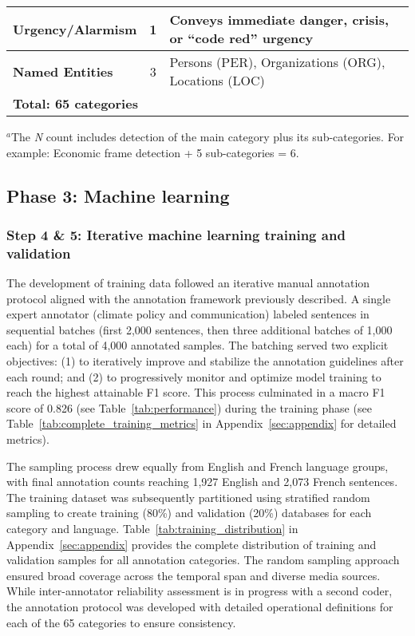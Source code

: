 \documentclass[12pt]{article}
\begin{document}
\begin{table}[!ht]
\begin{tabularx}{\textwidth}{lcX}
\midrule
\cellcolor{gray!10}\textbf{Urgency/Alarmism} & \cellcolor{gray!10}1 & \cellcolor{gray!10}Conveys immediate danger, crisis, or ``code red'' urgency \\
\midrule
\cellcolor{gray!10}\textbf{Named Entities} & \cellcolor{gray!10}3 & \cellcolor{gray!10}Persons (PER), Organizations (ORG), Locations (LOC) \\
\midrule
\multicolumn{3}{l}{\cellcolor{gray!25}\textbf{Total: 65 categories}} \\
\bottomrule
\end{tabularx}
\vspace{-0.1em}
{\footnotesize $^a$The \emph{N} count includes detection of the main category plus its sub-categories. For example: Economic frame detection + 5 sub-categories = 6.}
\end{table}

\subsection{Phase 3: Machine learning}
\subsubsection{Step 4 \& 5: Iterative machine learning training and validation}

The development of training data followed an iterative manual annotation protocol aligned with the annotation framework previously described. A single expert annotator (climate policy and communication) labeled sentences in sequential batches (first 2,000 sentences, then three additional batches of 1,000 each) for a total of 4,000 annotated samples. The batching served two explicit objectives: (1) to iteratively improve and stabilize the annotation guidelines after each round; and (2) to progressively monitor and optimize model training to reach the highest attainable F1 score. This process culminated in a macro F1 score of 0.826 (see Table~\ref{tab:performance}) during the training phase (see Table~\ref{tab:complete_training_metrics} in Appendix~\ref{sec:appendix} for detailed metrics).

The sampling process drew equally from English and French language groups, with final annotation counts reaching 1,927 English and 2,073 French sentences. The training dataset was subsequently partitioned using stratified random sampling to create training (80\%) and validation (20\%) databases for each category and language. Table~\ref{tab:training_distribution} in Appendix~\ref{sec:appendix} provides the complete distribution of training and validation samples for all annotation categories. The random sampling approach ensured broad coverage across the temporal span and diverse media sources. While inter-annotator reliability assessment is in progress with a second coder, the annotation protocol was developed with detailed operational definitions for each of the 65 categories to ensure consistency.
\end{document}
